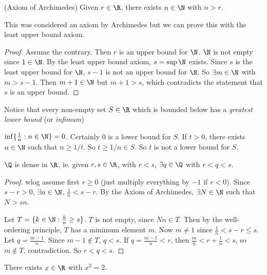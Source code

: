 \documentclass[a4paper]{article}
\begin{document}
  \begin{thm}
    (Axiom of Archimedes) Given $r\in \R$, there exists $n\in \N$ with $n > r$.
  \end{thm}

  \note This was considered an axiom by Archimedes but we can prove this with the least upper bound axiom.

  \begin{proof}
    Assume the contrary. Then $r$ is an upper bound for $\N$. $\N$ is not empty since $1\in \N$. By the least upper bound axiom, $s = \sup \N$ exists. Since $s$ is the least upper bound for $\N$, $s - 1$ is not an upper bound for $\N$. So $\exists m\in \N$ with $m > s - 1$. Then $m + 1\in \N$ but $m + 1 > s$, which contradicts the statement that $s$ is an upper bound.
  \end{proof}

  Notice that every non-empty set $S\in \R$ which is bounded below has a \emph{greatest lower bound} (or \emph{infimum})

  \begin{prop}
    $\inf\{\frac{1}{n}: n\in \N\} = 0$. 
    Certainly $0$ is a lower bound for $S$. If $t > 0$, there exists $n \in \N$ such that $n \geq 1/t$. So $t \geq 1/n\in S$. So $t$ is not a lower bound for $S$.
  \end{prop}

  \begin{thm}
    $\Q$ is dense in $\R$, ie. given $r, s\in \R$, with $r < s$, $\exists q\in \Q$ with $r < q < s$.
  \end{thm}

  \begin{proof}
    wlog assume first $r \geq 0$ (just multiply everything by $-1$ if $r < 0$). Since $s - r > 0$, $\exists n\in \N$, $\frac{1}{n} < s - r$. By the Axiom of Archimedes, $\exists N\in \N$ such that $N > sn$.

    Let $T = \{k\in \N: \frac{k}{n}\geq s\}$. $T$ is not empty, since $Nn\in T$. Then by the well-ordering principle, $T$ has a minimum element $m$. Now $m\not= 1$ since $\frac{1}{n} < s - r \leq s$. Let $q = \frac{m - 1}{n}$. Since $m - 1\not\in T$, $q < s$. If $q =\frac{m - 1}{n}< r$, then $\frac{m}{n} < r + \frac{1}{n} < s$, so $m\not\in T$, contradiction. So $r < q < s$.
  \end{proof}

  \begin{thm}
    There exists $x\in \R$ with $x^2 = 2$.
  \end{thm}
\end{document}
